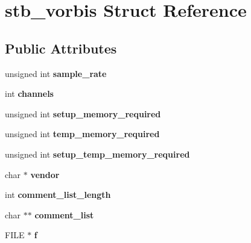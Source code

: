 \hypertarget{structstb__vorbis}{}\section{stb\+\_\+vorbis Struct Reference}
\label{structstb__vorbis}
\subsection*{Public Attributes}
\begin{DoxyCompactItemize}
\item 
\mbox{\label{structstb__vorbis_aea5df8cb01245c5a3658f2b48cd74ad1}} 
unsigned int {\bfseries sample\+\_\+rate}
\item 
\mbox{\label{structstb__vorbis_ad7f03b7568a58e7c92f3a867a1030df3}} 
int {\bfseries channels}
\item 
\mbox{\label{structstb__vorbis_af6552029487a8eb38da473b0cc6a60c6}} 
unsigned int {\bfseries setup\+\_\+memory\+\_\+required}
\item 
\mbox{\label{structstb__vorbis_a8ed60a85b7e09e19b5eee4068cd983f1}} 
unsigned int {\bfseries temp\+\_\+memory\+\_\+required}
\item 
\mbox{\label{structstb__vorbis_a52b6994c72625b043f9ae3fa0bc40893}} 
unsigned int {\bfseries setup\+\_\+temp\+\_\+memory\+\_\+required}
\item 
\mbox{\label{structstb__vorbis_a34ef41a9d003edf14762835badef21d5}} 
char $\ast$ {\bfseries vendor}
\item 
\mbox{\label{structstb__vorbis_a42307fb1bb6efa514afc2d0e6d5b9a04}} 
int {\bfseries comment\+\_\+list\+\_\+length}
\item 
\mbox{\label{structstb__vorbis_afc7c27ee48d18699ce090368efdf45c4}} 
char $\ast$$\ast$ {\bfseries comment\+\_\+list}
\item 
\mbox{\label{structstb__vorbis_ab345e7bff2cbf3c100593c0d684cb3e7}} 
F\+I\+LE $\ast$ {\bfseries f}
\item 
$$
\end{DoxyCompactItemize}
